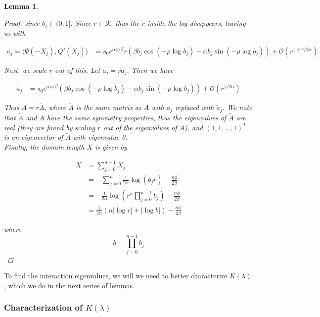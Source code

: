 \documentclass[12pt]{article}
\newtheorem{lemma}{Lemma}
\begin{document}
\begin{lemma}
\begin{proof}
since $b_j \in (0, 1]$. Since $r \in \mathcal{R}$, thus the $r$ inside the log disappears, leaving us with

\begin{align*}
a_j = \langle \Psi(-X_j), Q'(X_j) \rangle 
&= s_0 e^{\alpha \phi/\beta} r \left( \beta b_j \cos\left( -\rho \log b_j \right) - \alpha b_j \sin \left( -\rho \log b_j  \right) \right) + \mathcal{O}(r^{1+\gamma/2\alpha})
\end{align*}

Next, we scale $r$ out of this. Let $a_j = r \tilde{a}_j$. Then we have

\begin{align*}
\tilde{a}_j 
&= s_0 e^{\alpha \phi/\beta} \left( \beta b_j \cos\left( -\rho \log b_j \right) - \alpha b_j \sin \left( -\rho \log b_j  \right) \right) + \mathcal{O}(r^{\gamma/2\alpha})
\end{align*}

Thus $A = r \tilde{A}$, where $\tilde{A}$ is the same matrix as $A$ with $a_j$ replaced with $\tilde{a}_j$. We note that $\tilde{A}$ and $A$ have the same symmetry properties, thus the eigenvalues of $\tilde{A}$ are real (they are found by scaling $r$ out of the eigenvalues of $A$), and $(1,1,\dots,1)^T$ is an eigenvector of $\tilde{A}$ with eigenvalue 0. \\

Finally, the domain length $X$ is given by

\begin{align*}
X &= \sum_{j=0}^{n-1} X_j \\
&= -\sum_{j=0}^{n-1} \frac{1}{2\alpha}\log(b_j r) - \frac{n \phi}{2 \beta}\\
&= -\frac{1}{2\alpha} \log\left( r^n \prod_{j=0}^{n-1} b_j \right) - \frac{n \phi}{2 \beta} \\
&= \frac{1}{2\alpha} (n |\log r| + |\log b| ) - \frac{n \phi}{2 \beta}
\end{align*}

where 
\[
b = \prod_{j=0}^{n-1} b_j
\]

\end{proof}
\end{lemma}

To find the interaction eigenvalues, we will we need to better characterize $K(\lambda)$, which we do in the next series of lemmas.

\subsubsection{Characterization of \texorpdfstring{$K(\lambda)$}{K} }
\end{document}

